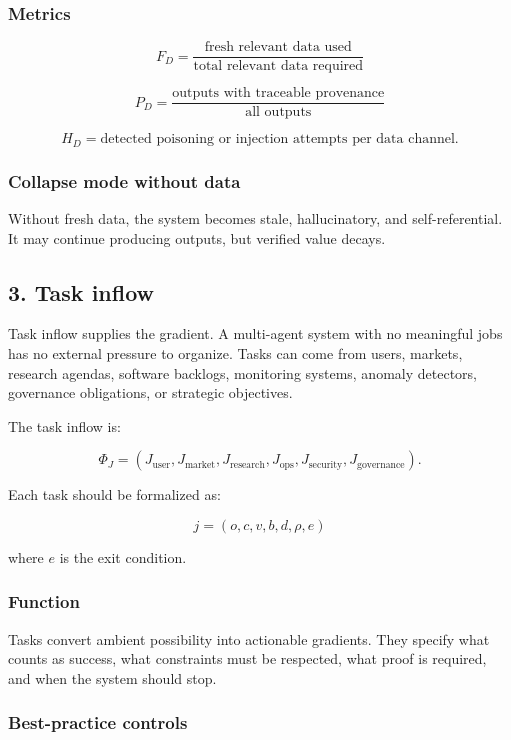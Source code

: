 \documentclass[
  11pt,
]{article}
\begin{document}
\subsubsection{Metrics}\label{metrics-1}

\[
F_D=\frac{\text{fresh relevant data used}}{\text{total relevant data required}}
\]

\[
P_D=\frac{\text{outputs with traceable provenance}}{\text{all outputs}}
\]

\[
H_D=\text{detected poisoning or injection attempts per data channel}.
\]

\subsubsection{Collapse mode without
data}\label{collapse-mode-without-data}

Without fresh data, the system becomes stale, hallucinatory, and
self-referential. It may continue producing outputs, but verified value
decays.

\subsection{3. Task inflow}\label{task-inflow}

Task inflow supplies the gradient. A multi-agent system with no
meaningful jobs has no external pressure to organize. Tasks can come
from users, markets, research agendas, software backlogs, monitoring
systems, anomaly detectors, governance obligations, or strategic
objectives.

The task inflow is:

\[
\Phi_J=(J_{\text{user}},J_{\text{market}},J_{\text{research}},J_{\text{ops}},J_{\text{security}},J_{\text{governance}}).
\]

Each task should be formalized as:

\[
j=(o,c,v,b,d,\rho,e)
\]

where \(e\) is the exit condition.

\subsubsection{Function}\label{function-2}

Tasks convert ambient possibility into actionable gradients. They
specify what counts as success, what constraints must be respected, what
proof is required, and when the system should stop.

\subsubsection{Best-practice controls}\label{best-practice-controls-2}
\end{document}
